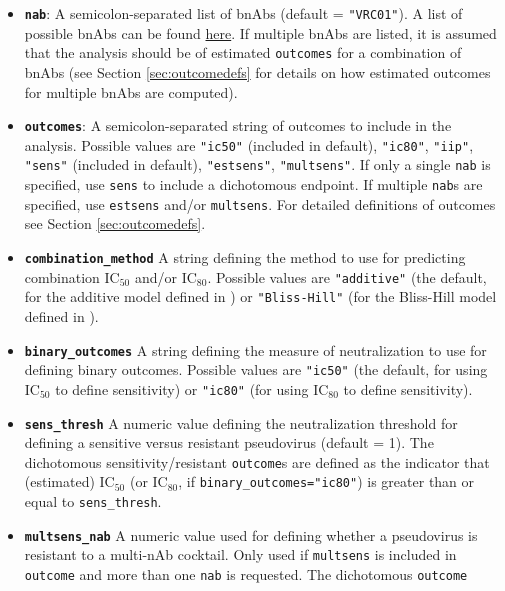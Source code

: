 \documentclass[]{article}
\providecommand{\tightlist}{%
  \setlength{\itemsep}{0pt}\setlength{\parskip}{0pt}}
\begin{document}
\begin{itemize}
\tightlist
\item
  \textbf{\texttt{nab}}: A semicolon-separated list of bnAbs (default =
  \texttt{"VRC01"}). A list of possible bnAbs can be found
  \href{https://www.hiv.lanl.gov/components/sequence/HIV/neutralization/main.comp}{here}.
  If multiple bnAbs are listed, it is assumed that the analysis should
  be of estimated \texttt{outcomes} for a combination of bnAbs (see
  Section \ref{sec:outcomedefs} for details on how estimated outcomes
  for multiple bnAbs are computed).
\item
  \textbf{\texttt{outcomes}}: A semicolon-separated string of outcomes
  to include in the analysis. Possible values are \texttt{"ic50"}
  (included in default), \texttt{"ic80"}, \texttt{"iip"},
  \texttt{"sens"} (included in default), \texttt{"estsens"},
  \texttt{"multsens"}. If only a single \texttt{nab} is specified, use
  \texttt{sens} to include a dichotomous endpoint. If multiple
  \texttt{nab}s are specified, use \texttt{estsens} and/or
  \texttt{multsens}. For detailed definitions of outcomes see Section
  \ref{sec:outcomedefs}.
\item
  \textbf{\texttt{combination\_method}} A string defining the method to
  use for predicting combination IC\(_{50}\) and/or IC\(_{80}\).
  Possible values are \texttt{"additive"} (the default, for the additive
  model defined in \citep{wagh2016optimal}) or \texttt{"Bliss-Hill"}
  (for the Bliss-Hill model defined in \citep{wagh2016optimal}).
\item
  \textbf{\texttt{binary\_outcomes}} A string defining the measure of
  neutralization to use for defining binary outcomes. Possible values
  are \texttt{"ic50"} (the default, for using IC\(_{50}\) to define
  sensitivity) or \texttt{"ic80"} (for using IC\(_{80}\) to define
  sensitivity).
\item
  \textbf{\texttt{sens\_thresh}} A numeric value defining the
  neutralization threshold for defining a sensitive versus resistant
  pseudovirus (default = 1). The dichotomous sensitivity/resistant
  \texttt{outcome}s are defined as the indicator that (estimated)
  IC\(_{50}\) (or IC\(_{80}\), if \texttt{binary\_outcomes="ic80"}) is
  greater than or equal to \texttt{sens\_thresh}.
\item
  \textbf{\texttt{multsens\_nab}} A numeric value used for defining
  whether a pseudovirus is resistant to a multi-nAb cocktail. Only used
  if \texttt{multsens} is included in \texttt{outcome} and more than one
  \texttt{nab} is requested. The dichotomous \texttt{outcome}

\end{itemize}
\end{document}
